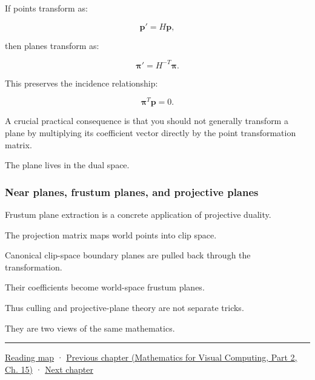If points transform as:

\[
 \mathbf p'=H\mathbf p,
\]

then planes transform as:

\[
 \boxed{ \boldsymbol\pi'=H^{-T}\boldsymbol\pi }.
\]

This preserves the incidence relationship:

\[
 \boldsymbol\pi^T\mathbf p=0.
\]

A crucial practical consequence is that you should not generally transform a plane by multiplying its coefficient vector directly by the point transformation matrix.

The plane lives in the dual space.

\subsubsection{Near planes, frustum planes, and projective planes}\label{02-foundations-ii-ch032-near-planes-frustum-planes-and-projective-planes}

\hypertarget{02-foundations-ii-ch032-near-planes-frustum-planes-and-projective-planes}{}

Frustum plane extraction is a concrete application of projective duality.

The projection matrix maps world points into clip space.

Canonical clip-space boundary planes are pulled back through the transformation.

Their coefficients become world-space frustum planes.

Thus culling and projective-plane theory are not separate tricks.

They are two views of the same mathematics.

\begin{center}\rule{0.5\linewidth}{0.5pt}\end{center}

\hyperref[volume-reading-map]{Reading map} · \href{../02-Mathematics-for-Visual-Computing-P02/main.pdf\#nameddest=02-foundations-ii-ch031-implement-probability-with-numerical-contracts}{Previous chapter (Mathematics for Visual Computing, Part 2, Ch. 15)} · \hyperref[02-foundations-ii-ch033-projection-clipping-and-raster-sampling]{Next chapter}
